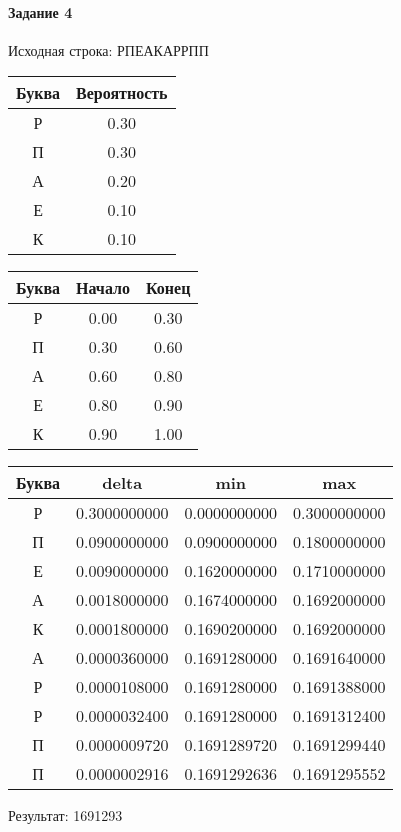 \documentclass[a4paper, 12pt]{article}
\begin{document}
\paragraph{Задание 4}


Исходная строка: РПЕАКАРРПП

\begin{center}
 \begin{tabular}{ |c|c| } 
  \hline
     Буква & Вероятность \\ \hline
Р & 0.30\\\hline
П & 0.30\\\hline
А & 0.20\\\hline
Е & 0.10\\\hline
К & 0.10
\\ \hline \end{tabular}
\end{center}
\begin{center}
 \begin{tabular}{ |c|c|c| } 
  \hline
     Буква & Начало & Конец \\ \hline
Р & 0.00 & 0.30\\\hline
П & 0.30 & 0.60\\\hline
А & 0.60 & 0.80\\\hline
Е & 0.80 & 0.90\\\hline
К & 0.90 & 1.00
\\ \hline \end{tabular}
\end{center}
\begin{center}
 \begin{tabular}{ |c|c|c|c| } 
  \hline
     Буква & delta & min & max \\ \hline
Р & 0.3000000000 & 0.0000000000 & 0.3000000000\\\hline
П & 0.0900000000 & 0.0900000000 & 0.1800000000\\\hline
Е & 0.0090000000 & 0.1620000000 & 0.1710000000\\\hline
А & 0.0018000000 & 0.1674000000 & 0.1692000000\\\hline
К & 0.0001800000 & 0.1690200000 & 0.1692000000\\\hline
А & 0.0000360000 & 0.1691280000 & 0.1691640000\\\hline
Р & 0.0000108000 & 0.1691280000 & 0.1691388000\\\hline
Р & 0.0000032400 & 0.1691280000 & 0.1691312400\\\hline
П & 0.0000009720 & 0.1691289720 & 0.1691299440\\\hline
П & 0.0000002916 & 0.1691292636 & 0.1691295552
\\ \hline \end{tabular}
\end{center}
Результат: 1691293
\pagebreak
\end{document}
